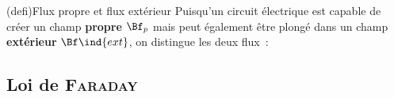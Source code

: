 \documentclass[../../main/main.tex]{subfiles}
\begin{document}
\begin{tcb*}(defi){Flux propre et flux extérieur}
	Puisqu'un circuit électrique est capable de créer un champ \textbf{propre}
	$\Bf_p$ mais peut également être plongé dans un champ \textbf{extérieur}
	$\Bf\ind{ext}$, on distingue les deux flux~:
	\smallbreak
	\begin{isd}
		\psw{%
			\[
				\F_p = \iint_{S} \Bf_p \cdot \vv{S}
			\]
		}%
		\vspace{-15pt}
		\tcblower
		\psw{%
			\[
				\F\ind{ext} = \iint_{S} \Bf\ind{ext} \cdot \vv{S}
			\]
		}%
		\vspace{-15pt}
	\end{isd}
\end{tcb*}

\subsection{Loi de \textsc{Faraday}}
\label{ssec:fara}
\end{document}
